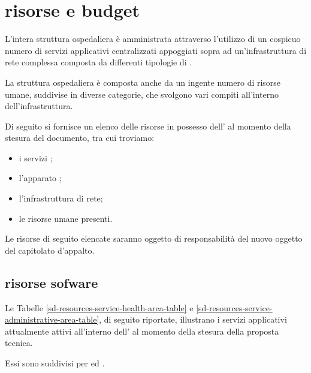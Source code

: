%
%
\section[Risorse e budget]{risorse e budget}
\label{sd-resources}
L'intera struttura ospedaliera è amministrata attraverso l'utilizzo di un cospicuo numero di servizi applicativi centralizzati appoggiati
sopra ad un'infrastruttura di rete complessa composta da differenti tipologie di .

La struttura ospedaliera è composta anche da un ingente numero di risorse umane, suddivise in diverse categorie, che svolgono vari compiti all'interno dell'infrastruttura.

Di seguito si fornisce un elenco delle risorse in possesso dell'\entity{} al momento della stesura del documento, tra cui troviamo:

\begin{itemize}
\item{i servizi ;}
\item{l'apparato ;}
\item{l'infrastruttura di rete;}
\item{le risorse umane presenti.}
\end{itemize}

Le risorse di seguito elencate saranno oggetto di responsabilità del nuovo  oggetto del capitolato d'appalto.

\subsection[Risorse software]{risorse sofware}
\label{sd-resources-software}
Le Tabelle \ref{sd-resources-service-health-area-table} e \ref{sd-resources-service-administrative-area-table}, di seguito riportate, illustrano i servizi applicativi attualmente attivi all'interno dell'\entity{} al momento della stesura della proposta tecnica. 

Essi sono suddivisi per  ed .


